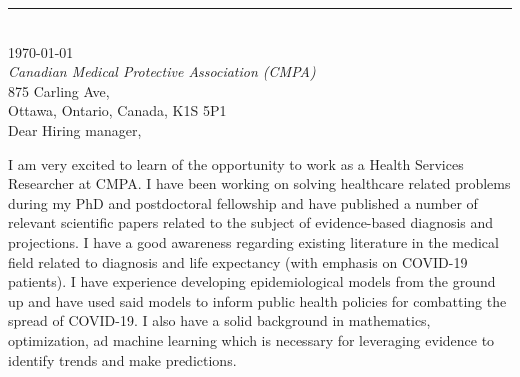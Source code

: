\documentclass[12pt]{article} %
\begin{document}
\medskip %
\rule[0pt]{\textwidth}{1pt}\\
\today\\[6pt]
\textit{Canadian Medical Protective Association (CMPA)}\\
875 Carling Ave,\\
Ottawa, Ontario, Canada, K1S 5P1\\[6pt] \medskip
Dear Hiring manager,


\medskip %
I am very excited to learn of the opportunity to work as a Health Services Researcher at CMPA. I have been working on solving healthcare related problems during my PhD and postdoctoral fellowship and have published a number of relevant scientific papers related to the subject of evidence-based diagnosis and projections. I have a good awareness regarding existing literature in the medical field related to diagnosis and life expectancy (with emphasis on COVID-19 patients). I have experience developing epidemiological models from the ground up and have used said models to inform public health policies for combatting the spread of COVID-19. I also have a solid background in mathematics, optimization, ad machine learning which is necessary for leveraging evidence to identify trends and make predictions.

\end{document}
